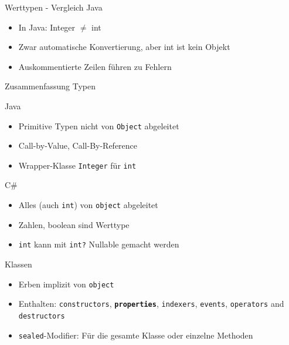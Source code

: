 \documentclass[11pt]{beamer}
\begin{document}
\begin{frame}{Werttypen - Vergleich Java}
	\begin{itemize}
		\item In Java: Integer $\neq$ int
		\item Zwar automatische Konvertierung, aber int ist kein Objekt
		\item Auskommentierte Zeilen führen zu Fehlern
	\end{itemize}
	
\end{frame}


\begin{frame}{Zusammenfassung Typen}
\setlength{\columnseprule}{0.4pt}
\begin{multicols}{2}
	Java \\
	\begin{itemize}
		\item Primitive Typen nicht von \texttt{Object} abgeleitet
		\item Call-by-Value, Call-By-Reference
		\item Wrapper-Klasse \texttt{Integer} für \texttt{int}
	\end{itemize}

\columnbreak

	C\#\\
	\begin{itemize}
		\item Alles (auch \texttt{int}) von \texttt{object} abgeleitet
		\item Zahlen, boolean sind \glqq{}Werttype\grqq{}
		\item \texttt{int} kann mit \texttt{int?} Nullable gemacht werden
	\end{itemize}
\end{multicols}
\end{frame}


\begin{frame}{Klassen}

	\begin{itemize}
		\item Erben implizit von \texttt{object}
		\item  Enthalten: \texttt{constructors}, \textbf{\texttt{properties}}, \texttt{indexers}, \texttt{events}, \texttt{operators} and \texttt{destructors}
		 \item \texttt{sealed}-Modifier: Für die gesamte Klasse oder einzelne Methoden
	\end{itemize}

\end{frame}
\end{document}
